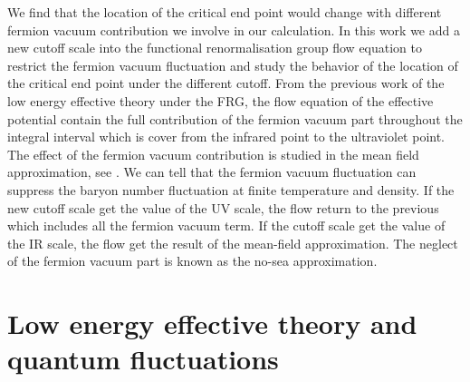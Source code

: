 \documentclass[%
reprint,
superscriptaddress,
showpacs,preprintnumbers,
 amsmath,amssymb,
 aps,
prd,
]{revtex4-1}
\begin{document}
\par We find that the location of the critical end point would change with different fermion vacuum contribution we involve in our calculation. In this work we add a new cutoff scale into the functional renormalisation group flow equation to restrict the fermion vacuum fluctuation and study the behavior of the location of the critical end point under the different cutoff. From the previous work of the low energy effective theory under the FRG, the flow equation of the effective potential contain the full contribution of the fermion vacuum part throughout the integral interval which is cover from the infrared point to the ultraviolet point. The effect of the fermion vacuum contribution is studied in the mean field approximation, see \cite{Skokov:2010sf}. We can tell that the fermion vacuum fluctuation can suppress the baryon number fluctuation at finite temperature and density. If the new cutoff scale get the value of the UV scale, the flow return to the previous which includes all the fermion vacuum term. If the cutoff scale get the value of the IR scale, the flow get the result of the mean-field approximation. The neglect of the fermion vacuum part is known as the no-sea approximation.

\section{Low energy effective theory and quantum fluctuations}
\label{sec:LEFT}
\end{document}

